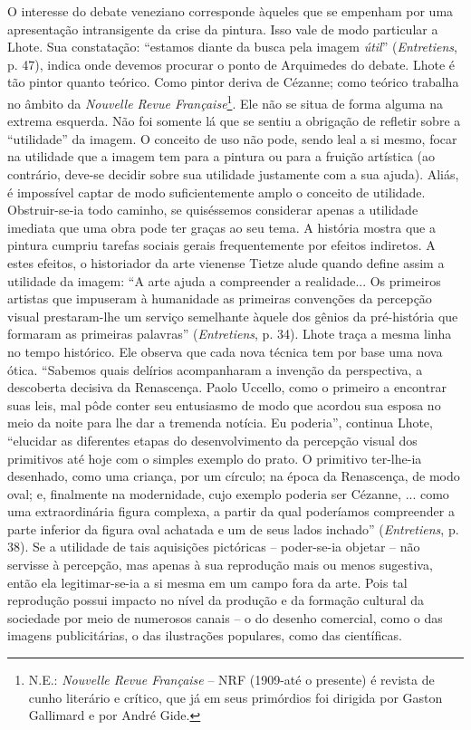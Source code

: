 O interesse do debate veneziano corresponde àqueles que se empenham por
uma apresentação intransigente da crise da pintura. Isso vale de modo
particular a Lhote. Sua constatação: ``estamos diante da busca pela
imagem \emph{útil}'' (\emph{Entretiens}, p. 47), indica onde devemos
procurar o ponto de Arquimedes do debate. Lhote é tão pintor quanto
teórico. Como pintor deriva de Cézanne; como teórico trabalha no âmbito
da \emph{Nouvelle Revue Française}\footnote{N.E.: \emph{Nouvelle Revue
  Française} -- NRF (1909-até o presente) é revista de cunho literário e
  crítico, que já em seus primórdios foi dirigida por Gaston Gallimard e
  por André Gide.}. Ele não se situa de forma alguma na extrema
esquerda. Não foi somente lá que se sentiu a obrigação de refletir sobre
a ``utilidade'' da imagem. O conceito de uso não pode, sendo leal a si
mesmo, focar na utilidade que a imagem tem para a pintura ou para a
fruição artística (ao contrário, deve-se decidir sobre sua utilidade
justamente com a sua ajuda). Aliás, é impossível captar de modo
suficientemente amplo o conceito de utilidade. Obstruir-se-ia todo
caminho, se quiséssemos considerar apenas a utilidade imediata que uma
obra pode ter graças ao seu tema. A história mostra que a pintura
cumpriu tarefas sociais gerais frequentemente por efeitos indiretos. A
estes efeitos, o historiador da arte vienense Tietze alude quando define
assim a utilidade da imagem: ``A arte ajuda a compreender a realidade...
Os primeiros artistas que impuseram à humanidade as primeiras convenções
da percepção visual prestaram-lhe um serviço semelhante àquele dos
gênios da pré-história que formaram as primeiras palavras''
(\emph{Entretiens}, p. 34). Lhote traça a mesma linha no tempo
histórico. Ele observa que cada nova técnica tem por base uma nova
ótica. ``Sabemos quais delírios acompanharam a invenção da perspectiva,
a descoberta decisiva da Renascença. Paolo Uccello, como o primeiro a
encontrar suas leis, mal pôde conter seu entusiasmo de modo que acordou
sua esposa no meio da noite para lhe dar a tremenda notícia. Eu
poderia'', continua Lhote, ``elucidar as diferentes etapas do
desenvolvimento da percepção visual dos primitivos até hoje com o
simples exemplo do prato. O primitivo ter-lhe-ia desenhado, como uma
criança, por um círculo; na época da Renascença, de modo oval; e,
finalmente na modernidade, cujo exemplo poderia ser Cézanne, ... como
uma extraordinária figura complexa, a partir da qual poderíamos
compreender a parte inferior da figura oval achatada e um de seus lados
inchado'' (\emph{Entretiens}, p. 38). Se a utilidade de tais aquisições
pictóricas -- poder-se-ia objetar -- não servisse à percepção, mas
apenas à sua reprodução mais ou menos sugestiva, então ela
legitimar-se-ia a si mesma em um campo fora da arte. Pois tal reprodução
possui impacto no nível da produção e da formação cultural da sociedade
por meio de numerosos canais -- o do desenho comercial, como o das
imagens publicitárias, o das ilustrações populares, como das
científicas.

